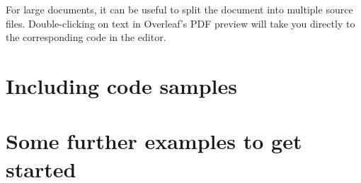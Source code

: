 \documentclass[a4paper]{manual}
\begin{document}
For large documents, it can be useful to split the document into multiple source files.
Double-clicking on text in Overleaf's PDF preview will take you directly to the corresponding code in the editor.

\section{Including code samples}



\section{Some further examples to get started}


\end{document}
